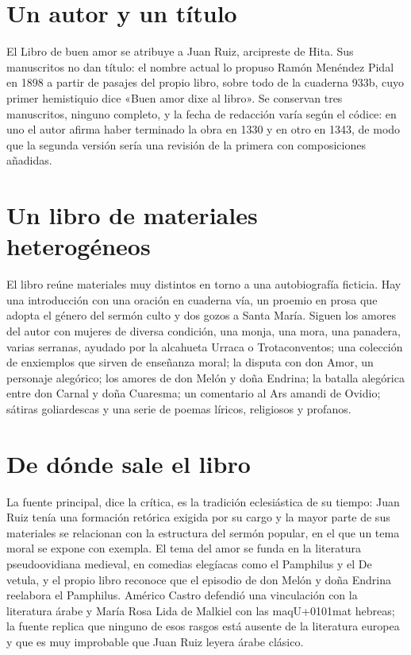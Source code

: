 \documentclass{book}
\begin{document}
\section{Un autor y un título}

El Libro de buen amor se atribuye a Juan Ruiz, arcipreste de Hita. Sus manuscritos no dan título: el nombre actual lo propuso Ramón Menéndez Pidal en 1898 a partir de pasajes del propio libro, sobre todo de la cuaderna 933b, cuyo primer hemistiquio dice «Buen amor dixe al libro». Se conservan tres manuscritos, ninguno completo, y la fecha de redacción varía según el códice: en uno el autor afirma haber terminado la obra en 1330 y en otro en 1343, de modo que la segunda versión sería una revisión de la primera con composiciones añadidas.


\section{Un libro de materiales heterogéneos}

El libro reúne materiales muy distintos en torno a una autobiografía ficticia. Hay una introducción con una oración en cuaderna vía, un proemio en prosa que adopta el género del sermón culto y dos gozos a Santa María. Siguen los amores del autor con mujeres de diversa condición, una monja, una mora, una panadera, varias serranas, ayudado por la alcahueta Urraca o Trotaconventos; una colección de enxiemplos que sirven de enseñanza moral; la disputa con don Amor, un personaje alegórico; los amores de don Melón y doña Endrina; la batalla alegórica entre don Carnal y doña Cuaresma; un comentario al Ars amandi de Ovidio; sátiras goliardescas y una serie de poemas líricos, religiosos y profanos.


\section{De dónde sale el libro}

La fuente principal, dice la crítica, es la tradición eclesiástica de su tiempo: Juan Ruiz tenía una formación retórica exigida por su cargo y la mayor parte de sus materiales se relacionan con la estructura del sermón popular, en el que un tema moral se expone con exempla. El tema del amor se funda en la literatura pseudoovidiana medieval, en comedias elegíacas como el Pamphilus y el De vetula, y el propio libro reconoce que el episodio de don Melón y doña Endrina reelabora el Pamphilus. Américo Castro defendió una vinculación con la literatura árabe y María Rosa Lida de Malkiel con las maq{U+0101}mat hebreas; la fuente replica que ninguno de esos rasgos está ausente de la literatura europea y que es muy improbable que Juan Ruiz leyera árabe clásico.
\end{document}
